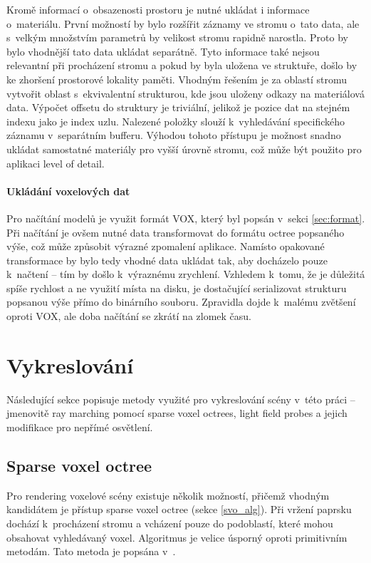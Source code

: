 Kromě informací o~obsazenosti prostoru je nutné ukládat i informace o~materiálu. První možností by bylo rozšířit záznamy ve stromu o~tato data, ale s~velkým množstvím parametrů by velikost stromu rapidně narostla. Proto by bylo vhodnější tato data ukládat separátně. Tyto informace také nejsou relevantní při procházení stromu a pokud by byla uložena ve struktuře, došlo by ke zhoršení prostorové lokality paměti. Vhodným řešením je za oblastí stromu vytvořit oblast s~ekvivalentní strukturou, kde jsou uloženy odkazy na materiálová data. Výpočet offsetu do struktury je triviální, jelikož je pozice dat na stejném indexu jako je index uzlu. Nalezené položky slouží k~vyhledávání specifického záznamu v~separátním bufferu. Výhodou tohoto přístupu je možnost snadno ukládat samostatné materiály pro vyšší úrovně stromu, což může být použito pro aplikaci level of detail.

\paragraph{Ukládání voxelových dat} Pro načítání modelů je využit formát VOX, který byl popsán v~sekci \ref{sec:format}. Při načítání je ovšem nutné data transformovat do formátu octree popsaného výše, což může způsobit výrazné zpomalení aplikace. Namísto opakované transformace by bylo tedy vhodné data ukládat tak, aby docházelo pouze k~načtení -- tím by došlo k~výraznému zrychlení. Vzhledem k~tomu, že je důležitá spíše rychlost a ne využití místa na disku, je dostačující serializovat strukturu popsanou výše přímo do binárního souboru. Zpravidla dojde k~malému zvětšení oproti VOX, ale doba načítání se zkrátí na zlomek času.

\section{Vykreslování}\label{sec:rendering}
Následující sekce popisuje metody využité pro vykreslování scény v~této práci -- jmenovitě ray marching pomocí sparse voxel octrees, light field probes a jejich modifikace pro nepřímé osvětlení.

\subsection{Sparse voxel octree}\label{sec:svo_design}
Pro rendering voxelové scény existuje několik možností, přičemž vhodným kandidátem je přístup sparse voxel octree (sekce \ref{svo_alg}). Při vržení paprsku dochází k~procházení stromu a vcházení pouze do podoblastí, které mohou obsahovat vyhledávaný voxel. Algoritmus je velice úsporný oproti primitivním metodám. Tato metoda je popsána v~\cite{Laine2011EfficientSV}.

